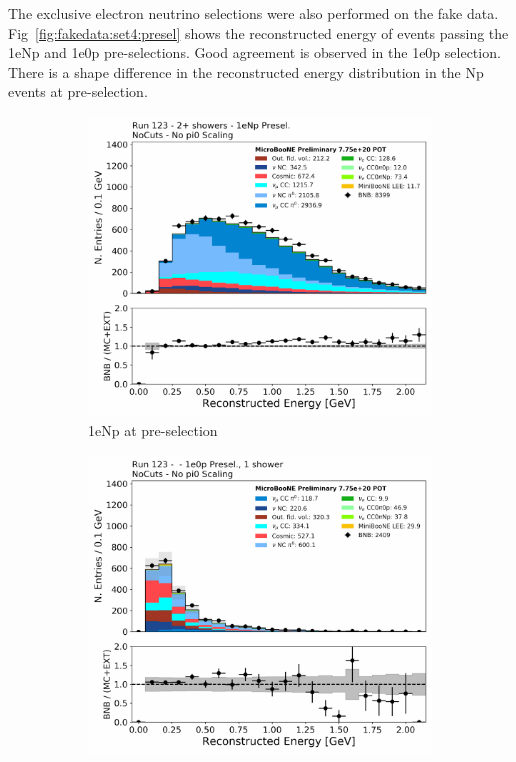 The exclusive electron neutrino selections were also performed on the fake data. Fig~\ref{fig:fakedata:set4:presel} shows the reconstructed energy of events passing the 1eNp and 1e0p pre-selections.  Good agreement is observed in the 1e0p selection.  There is a shape difference in the reconstructed energy distribution in the Np events at pre-selection.

\begin{figure}[H] 
\begin{center}
    \begin{subfigure}[b]{0.45\textwidth}
    \centering
    \includegraphics[width=1.00\textwidth]{Fakedata/set4/np_2shr.pdf}
    \caption{\label{fig:fakedata:set4:Np_presel_recoe} 1eNp at pre-selection}
    \end{subfigure}
    \begin{subfigure}[b]{0.45\textwidth}
    \centering
    \includegraphics[width=1.00\textwidth]{Fakedata/set4/zp_presel_recoe.pdf}

\end{subfigure}
\end{center}
\end{figure}
